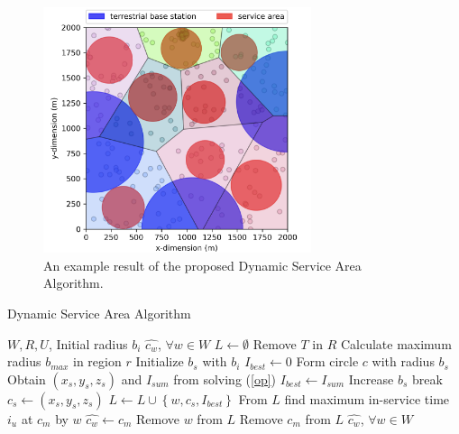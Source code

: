 \documentclass[a4paper,12pt]{report}
\begin{document}
\begin{figure} [h!]
    \centering
    \includegraphics[width=0.7\textwidth]{Figure 4.png}
    \caption{An example result of the proposed Dynamic Service Area Algorithm.}
    \label{fig:DSA example}
\end{figure}
\begin{algorithm}[t!]
    \caption{Dynamic Service Area Algorithm}
    \label{alg:DSA}
    \algrenewcommand{}
    \algrenewcommand{}
    \begin{algorithmic}
    \Require $W, R, U$, Initial radius $b_{i}$
    \Ensure $\hat{c_{w}}$, $\forall w \in W$
    \State $L \gets \emptyset$
    \State Remove $T$ in $R$
            \State Calculate maximum radius $b_{max}$ in region $r$
            \State Initialize $b_s$ with $b_i$
            \State $I_{best} \gets 0 $
                \State Form circle $c$ with radius $b_{s}$
                \State Obtain $(x_s, y_s, z_s)$ and $I_{sum}$ from solving (\ref{op})
                    \State $I_{best} \gets I_{sum}$
                    \State Increase $b_{s}$
                    \State break
                \EndIf
            \EndWhile
            \State $c_s \gets (x_s, y_s, z_s)$
            \State $L \gets L \cup \left \{ w, c_s, I_{best} \right \} $
        \EndFor
    \EndFor
        \State From $L$ find maximum in-service time $i_u$ at $c_m$ by $w$
        \State $\hat{c_{w}} \gets c_m$
        \State Remove $w$ from $L$
        \State Remove $c_m$ from $L$
    \EndWhile
    \State \Return $\hat{c_{w}}$, $\forall w \in W$
    \end{algorithmic}
\end{algorithm}
\end{document}
